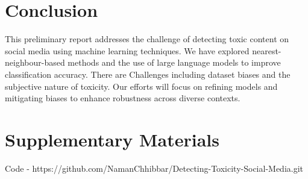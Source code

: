 \section{Conclusion}

This preliminary report addresses the challenge of detecting toxic content on social media using machine learning techniques. We have explored nearest-neighbour-based methods and the use of large language models to improve classification accuracy. There are Challenges including dataset biases and the subjective nature of toxicity. 
Our efforts will focus on refining models and mitigating biases to enhance robustness across diverse contexts.


\section{Supplementary Materials}
Code - https://github.com/NamanChhibbar/Detecting-Toxicity-Social-Media.git
